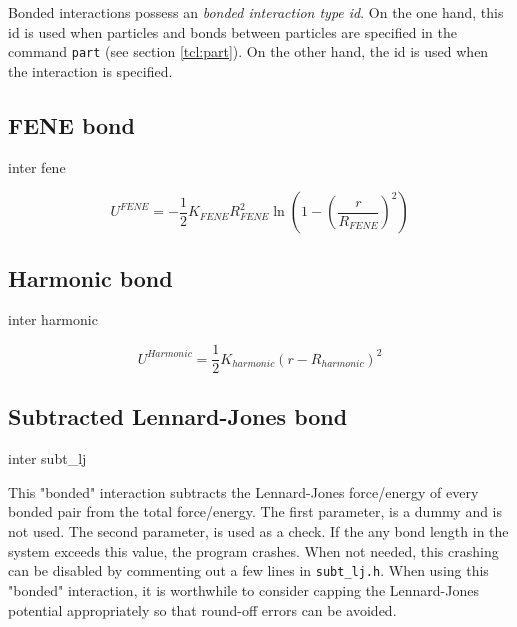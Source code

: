  Bonded interactions possess an
\emph{bonded interaction type id}. On the one hand, this id is used
when particles and bonds between particles are specified in the
command \texttt{part} (see section \vref{tcl:part}).  On the other
hand, the id is used when the interaction is specified.

\subsection{FENE bond}

\begin{essyntax}
  inter  
  fene
   
\end{essyntax}

\[ U^{FENE} = -\frac{1}{2} K_{FENE} R_{FENE}^2 \ln \left( 1 - \left( \frac{r}{R_{FENE}} \right)^2 \right) \]

\subsection{Harmonic bond}

\begin{essyntax}
  inter  
  harmonic
\end{essyntax}

\[ U^{Harmonic} = \frac{1}{2} K_{harmonic} \left( r - R_{harmonic} \right)^2 \] 

\subsection{Subtracted Lennard-Jones bond}

\begin{essyntax}
  inter  
  subt_lj
   
\end{essyntax}

This "bonded" interaction subtracts the Lennard-Jones force/energy of
every bonded pair from the total force/energy. The first parameter,
 is a dummy and is not used. The second parameter,
 is used as a check. If the any bond length in the
system exceeds this value, the program crashes. When not needed, this
crashing can be disabled by commenting out a few lines in
\texttt{subt_lj.h}.  When using this "bonded" interaction, it is
worthwhile to consider capping the Lennard-Jones potential
appropriately so that round-off errors can be avoided.

